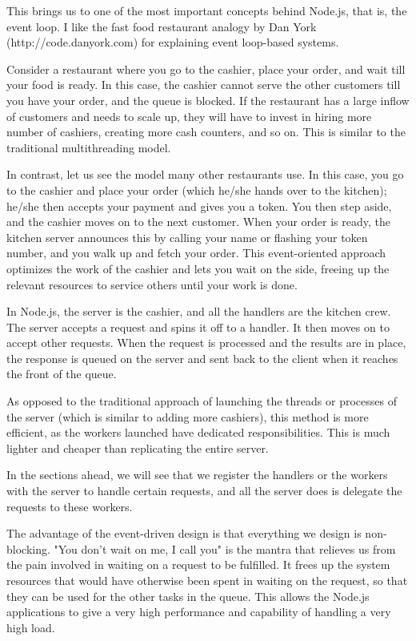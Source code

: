 This brings us to one of the most important concepts behind Node.js, that is, the event
loop. I like the fast food restaurant analogy by Dan York (http://code.danyork.com)
for explaining event loop-based systems.

Consider a restaurant where you go to the cashier, place your order, and wait till
your food is ready. In this case, the cashier cannot serve the other customers till you
have your order, and the queue is blocked. If the restaurant has a large inflow of
customers and needs to scale up, they will have to invest in hiring more number of
cashiers, creating more cash counters, and so on. This is similar to the traditional
multithreading model.

In contrast, let us see the model many other restaurants use. In this case, you go
to the cashier and place your order (which he/she hands over to the kitchen);
he/she then accepts your payment and gives you a token. You then step aside, and
the cashier moves on to the next customer. When your order is ready, the kitchen
server announces this by calling your name or flashing your token number, and you
walk up and fetch your order. This event-oriented approach optimizes the work of
the cashier and lets you wait on the side, freeing up the relevant resources to service
others until your work is done.

In Node.js, the server is the cashier, and all the handlers are the kitchen crew. The
server accepts a request and spins it off to a handler. It then moves on to accept other
requests. When the request is processed and the results are in place, the response is
queued on the server and sent back to the client when it reaches the front of the queue.

As opposed to the traditional approach of launching the threads or processes of the
server (which is similar to adding more cashiers), this method is more efficient, as the
workers launched have dedicated responsibilities. This is much lighter and cheaper
than replicating the entire server.

In the sections ahead, we will see that we register the handlers or the workers with
the server to handle certain requests, and all the server does is delegate the requests
to these workers.

The advantage of the event-driven design is that everything we design is
non-blocking. "You don't wait on me, I call you" is the mantra that relieves us from
the pain involved in waiting on a request to be fulfilled. It frees up the system
resources that would have otherwise been spent in waiting on the request, so that
they can be used for the other tasks in the queue. This allows the Node.js applications
to give a very high performance and capability of handling a very high load.

